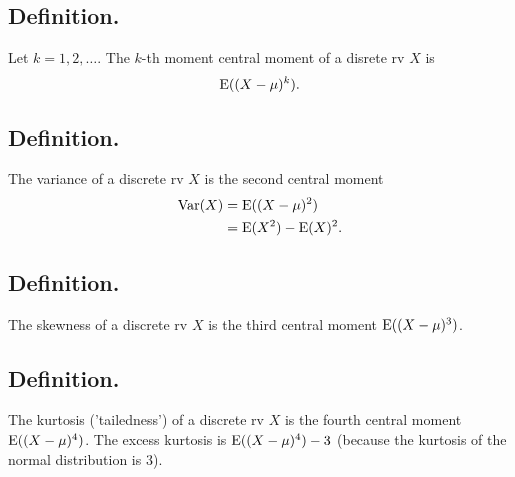 \documentclass[titlepage]{article}
\begin{document}
\subsection{Definition.} Let $k = 1, 2, \ldots$. The $k$-th moment central moment of a disrete rv $X$ is 
$$\text{E}((X-\mu)^{k}).$$

\subsection{Definition.} The variance of a discrete rv $X$ is the second central moment 
\begin{align*}
    \text{Var}(X) &= \text{E}((X-\mu)^{2}) \\
            &= \text{E}(X^{2}) - \text{E}(X)^{2}.
\end{align*}

\subsection{Definition.} The skewness of a discrete rv $X$ is the third central moment $\text{E}((X-\mu)^{3})$.

\subsection{Definition.} The kurtosis ('tailedness') of a discrete rv $X$ is the fourth central moment $\text{E}((X-\mu)^{4})$. The excess kurtosis is $\text{E}((X-\mu)^{4}) - 3$ (because the kurtosis of the normal distribution is $3$).
\end{document}
